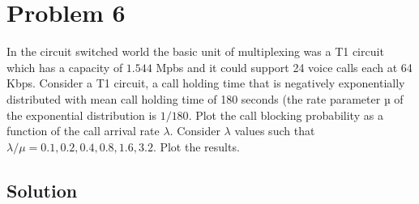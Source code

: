 
\section*{Problem 6}

In the circuit switched world the basic unit of multiplexing was a T1 circuit which has a capacity of $1.544$
Mpbs and it could support 24 voice calls each at 64 Kbps.
Consider a T1 circuit, a call holding time that is negatively exponentially distributed with mean call holding time of 180 seconds (the rate parameter µ of
the exponential distribution is $1/180$.
Plot the call blocking probability as a function of the call arrival rate $\lambda$.
Consider $\lambda$ values such that $\lambda/\mu = 0.1, 0.2, 0.4, 0.8, 1.6, 3.2$.
Plot the results.

\subsection*{Solution}

